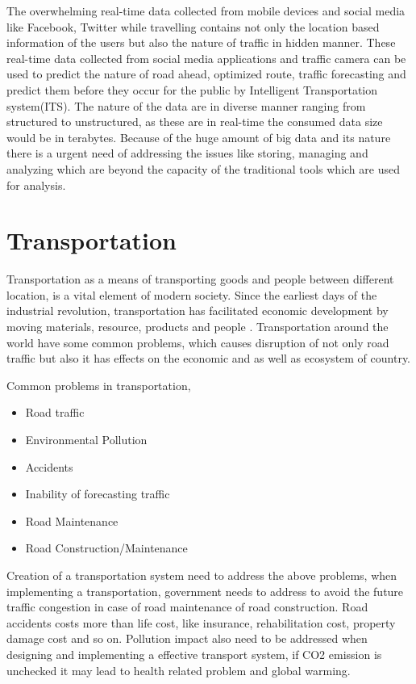 \documentclass[sigconf]{acmart}
\begin{document}
The overwhelming real-time data collected from mobile devices and social media like Facebook, Twitter while travelling contains not only the location based information of the users but also the nature of traffic in hidden manner. These real-time data collected from social media applications and traffic camera can be used to predict the nature of road ahead, optimized route, traffic forecasting and predict them before they occur for the public by Intelligent Transportation system(ITS)\cite{}. The nature of the data are in diverse manner ranging from structured to unstructured, as these are in real-time the consumed data size would be in terabytes. Because of the huge amount of big data and its nature there is a urgent need of addressing the issues like storing, managing and analyzing which are beyond the capacity of the traditional tools which are used for analysis.

\section{Transportation}

Transportation as a means of transporting goods and people between different location, is a vital element of modern society. Since the earliest days of the industrial revolution, transportation has facilitated economic development by moving materials, resource, products and people \cite{}. Transportation around the world have some common problems, which causes disruption of not only road traffic but also it has effects on the economic and as well as ecosystem of country.

Common problems in transportation,

\begin{itemize}
\item Road traffic
\item Environmental Pollution
\item Accidents
\item Inability of forecasting traffic
\item Road Maintenance
\item Road Construction/Maintenance 
\end{itemize}

Creation of a transportation system need to address the above problems, when implementing a transportation, government needs to address to avoid the future traffic congestion in case of road maintenance of road construction. Road accidents costs more than life cost, like insurance, rehabilitation cost, property damage cost and so on. Pollution impact also need to be addressed when designing and implementing a effective transport system, if CO2 emission is unchecked it may lead to health related problem and global warming.
\end{document}
